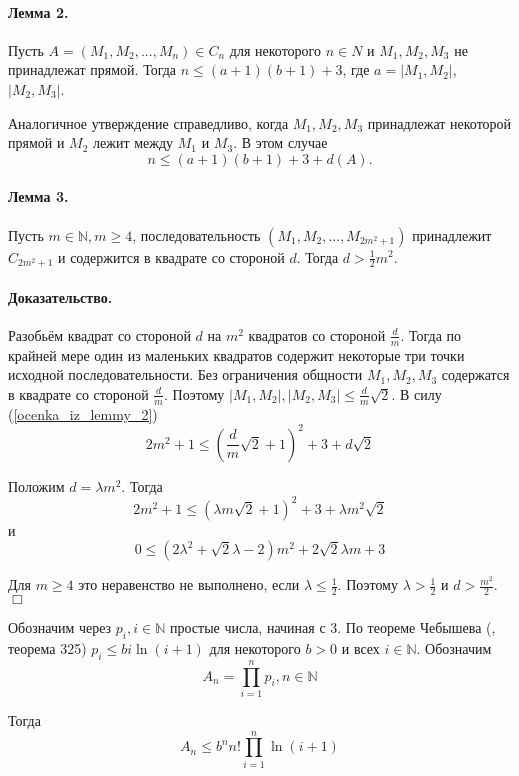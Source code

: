 \documentclass[a4paper,14pt]{article} %
\begin{document}
\paragraph{Лемма 2.}

Пусть $A=(M_1, M_2, ..., M_n) \in C_n$ для некоторого $n\in N$ и $M_1, M_2, M_3$ не принадлежат прямой.
Тогда $n\leq (a+1)(b+1)+3$, где $a=|M_1,M_2|$, $|M_2,M_3|$.

Аналогичное утверждение справедливо, когда $M_1,M_2,M_3$ принадлежат некоторой прямой и $M_2$ лежит между $M_1$ и $M_3$.
В этом случае
\begin{equation}\label{ocenka_iz_lemmy_2}
	n\leq (a+1)(b+1)+3+d(A).
\end{equation}



\paragraph{Лемма 3.}
Пусть $m\in\mathbb{N}, m\geq 4$, последовательность $(M_1,M_2,...,M_{2m^2+1})$ принадлежит $C_{2m^2+1}$ и содержится в квадрате со стороной $d$.
Тогда $d>\frac{1}{2}m^2$.

\paragraph{Доказательство.} Разобьём квадрат со стороной $d$ на $m^2$ квадратов со стороной $\frac{d}{m}$.
Тогда по крайней мере один из маленьких квадратов содержит некоторые три точки исходной последовательности.
Без ограничения общности $M_1,M_2,M_3$ содержатся в квадрате со стороной $\frac{d}{m}$.
Поэтому $|M_1,M_2|,|M_2,M_3| \leq \frac{d}{m}\sqrt{2}$.
В силу (\ref{ocenka_iz_lemmy_2})
$$
2m^2+1 \leq\left(\frac{d}{m}\sqrt{2}+1\right)^2+3+d\sqrt{2}
$$

Положим $d=\lambda m^2$.
Тогда
$$
2m^2+1 \leq \left(\lambda m \sqrt2 + 1 \right)^2 + 3 + \lambda m^2 \sqrt2
$$
и
$$
0\leq \left( 2\lambda^2 + \sqrt2 \lambda - 2 \right)m^2 + 2\sqrt2 \lambda m + 3
$$

Для $m\geq 4$ это неравенство не выполнено, если $\lambda \leq \frac{1}{2}$.
Поэтому $\lambda > \frac{1}{2}$ и $d>\frac{m^2}{2}$.
$\Box$


Обозначим через $p_i, i\in\mathbb{N}$ простые числа, начиная с 3.
По теореме Чебышева (\cite{Buhshtab}, теорема 325) $p_i \leq bi\ln(i+1)$ для некоторого $b>0$ и всех $i\in\mathbb{N}$.
Обозначим
$$
A_n=\prod_{i=1}^{n} p_i, n\in\mathbb{N}
$$

Тогда
$$
A_n\leq b^n n! \prod_{i=1}^{n} \ln(i+1)
$$
\end{document}
